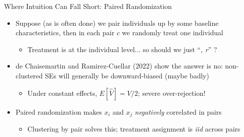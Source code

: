 \documentclass[11pt,english]{beamer}
\begin{document}
\begin{frame}{Where Intuition Can Fall Short: Paired Randomization}

\begin{itemize}
\item Suppose (as is often done) we pair individuals up by some baseline characteristics, then in each pair $c$ we randomly treat one individual\smallskip
\begin{itemize}
\item Treatment is at the individual level... so should we just ``\emph{, r}'' ?
\end{itemize}\bigskip\pause{}

\item de Chaisemartin and Ramirez-Cuellar (2022) show the answer is no: non-clustered SEs will generally be downward-biased (maybe badly)\smallskip
\begin{itemize}
\item Under constant effects, $E[\hat{V}]=V/2$; severe over-rejection!  
\end{itemize}\bigskip\pause{}

\item Paired randomization makes $x_i$ and $x_j$ \emph{negatively} correlated in pairs\smallskip
\begin{itemize}
\item Clustering by pair solves this; treatment assignment is \emph{iid} across pairs 
\end{itemize}
\end{itemize}

\end{frame}
\end{document}

